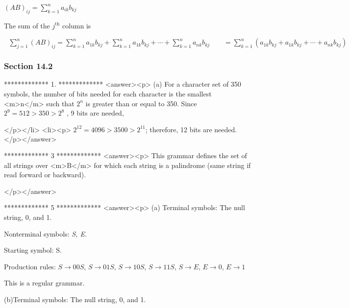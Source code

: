  \((A B)_{i j}= \sum _{k=1}^n a_{i k} b_{k j}\)



The sum of the \(j^{\text{th}}\) column is



\(\text{           }\sum _{j=1}^n (A B)_{i j}=\sum _{k=1}^n a_{1 k} b_{k j}+\sum _{k=1}^n a_{1k} b_{k j}+\cdots +\sum _{k=1}^n a_{n k} b_{k
j}\quad \quad =\sum _{k=1}^n \left(a_{1 k} b_{k j}+a_{1k} b_{k j}+\cdots +a_{n k} b_{k j}\right)\quad \quad =\sum _{k=1}^n b_{k j}\left(a_{1 k} +a_{1k}+\cdots
+a_{n k} \right)\text{  }\quad \quad = \sum _{k=1}^n  b_{k j}\text{               }\text{since} A \text{is} \text{stochastic}\quad \quad = 1\text{
                           }\text{since} B \text{is} \text{stochastic}\)


\subsubsection{Section 14.2}

*************
1.
*************
<answer><p> (a) For a character set of 350 symbols, the number of bits needed for each character is the smallest <m>n</m> such that \(2^n\) is greater
than or equal to 350.  Since   \(2^9= 512> 350 > 2^8\) ,  9 bits are needed, 

</p></li>
<li><p> \(2^{12}=4096>3500>2^{11}\); therefore, 12 bits are needed.</p></answer>


*************
3
*************
<answer><p> This grammar defines the set of all strings over <m>B</m> for which each string is a palindrome (same string if read forward or backward).


</p></answer>


*************
5
*************
<answer><p> (a) Terminal symbols: The null string, 0, and 1.



         Nonterminal symbols: \textit{ S, E.} 



         Starting symbol: S.



         Production rules: \(S\to 00S\), \(S\to 01S\),  \(S\to 10S\),  \(S\to 11S\),  \(S\to E\),  \(E\to 0\),  \(E\to 1\)



         This is a regular grammar.



    (b)Terminal symbols: The null string,  0,  and 1. 



